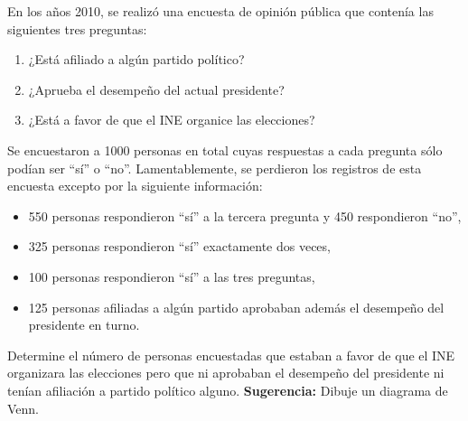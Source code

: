 \documentclass[12pt,a4paper]{article}
\begin{document}
    \begin{mdframed}[style=mdbluebox,frametitle={Ejercicio 6}]
        En los años 2010, se realizó una encuesta de opinión pública que contenía las siguientes tres preguntas:
        \begin{enumerate}
            \item ¿Está afiliado a algún partido político?
            \item ¿Aprueba el desempeño del actual presidente?
            \item ¿Está a favor de que el INE organice las elecciones?
        \end{enumerate}
        Se encuestaron a 1000 personas en total cuyas respuestas a cada pregunta sólo podían ser ``sí'' o ``no''. Lamentablemente, se perdieron los registros de esta encuesta excepto por la siguiente información:
        \begin{itemize}
            \item 550 personas respondieron ``sí'' a la tercera pregunta y 450 respondieron ``no'',
            \item 325 personas respondieron ``sí'' exactamente dos veces,
            \item 100 personas respondieron ``sí'' a las tres preguntas,
            \item 125 personas afiliadas a algún partido aprobaban además el desempeño del presidente en turno.
        \end{itemize}
        Determine el número de personas encuestadas que estaban a favor de que el INE organizara las elecciones pero que ni aprobaban el desempeño del presidente ni tenían afiliación a partido político alguno.
        \textbf{Sugerencia:} Dibuje un diagrama de Venn.
    \end{mdframed}
\end{document}
